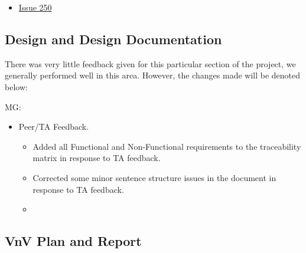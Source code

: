 \documentclass{article}
\begin{document}
\begin{itemize}
    \item \href{https://github.com/davimang/REACH/issues/250}{Issue 250}
\end{itemize}


\subsection{Design and Design Documentation}
There was very little feedback given for this particular section of the project, 
we generally performed well in this area. However, the changes made will be denoted below:

MG: 
\begin{itemize}
	\item Peer/TA Feedback.
	\begin{itemize}
        \item Added all Functional and Non-Functional requirements to the traceability matrix in response to TA feedback.
        \item Corrected some minor sentence structure issues in the document in response to TA feedback.
        \item 
    \end{itemize}
\end{itemize}
\subsection{VnV Plan and Report}
\end{document}
